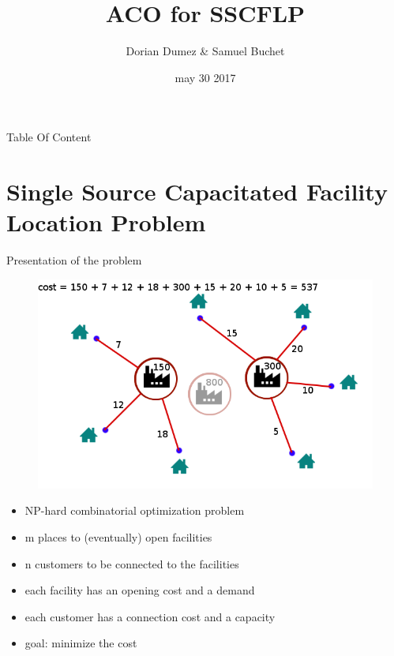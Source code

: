\documentclass{beamer}
\title{ACO for SSCFLP}
\author{Dorian Dumez \& Samuel Buchet}
\date{may 30 2017}
\begin{document}
\begin{frame}
  \titlepage
\end{frame}

\begin{frame}{Table Of Content}
  \tableofcontents
\end{frame}

\section{Single Source Capacitated Facility Location Problem}

\begin{frame}{Presentation of the problem}

    \begin{figure}
        \centering
        \includegraphics[scale=0.3]{schema}
    \end{figure}

    \begin{itemize}
        \item NP-hard combinatorial optimization problem
        \item m places to (eventually) open facilities
        \item n customers to be connected to the facilities
        \item each facility has an opening cost and a demand
        \item each customer has a connection cost and a capacity
        \item goal: minimize the cost
    \end{itemize}

\end{frame}
\end{document}
